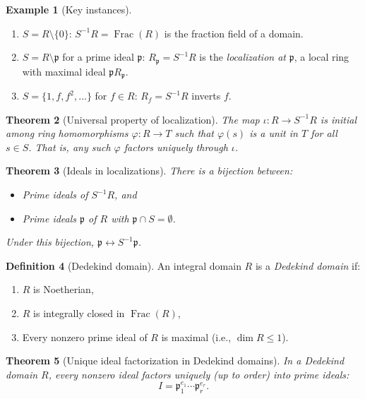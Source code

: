 \documentclass[12pt,a4paper]{amsart}
\newtheorem{theorem}{Theorem}[section]
\theoremstyle{definition}
\newtheorem{definition}[theorem]{Definition}
\newtheorem{example}[theorem]{Example}
\theoremstyle{definition}
\DeclareMathOperator{\Frac}{Frac}
\begin{document}
\begin{example}[Key instances]
\begin{enumerate}[label=(\alph*)]
  \item $S = R \setminus \{0\}$: $S^{-1}R = \Frac(R)$ is the fraction field of a domain.
  \item $S = R \setminus \mathfrak{p}$ for a prime ideal $\mathfrak{p}$:
        $R_\mathfrak{p} = S^{-1}R$ is the \emph{localization at} $\mathfrak{p}$,
        a local ring with maximal ideal $\mathfrak{p}R_\mathfrak{p}$.
  \item $S = \{1, f, f^2, \ldots\}$ for $f \in R$: $R_f = S^{-1}R$ inverts $f$.
\end{enumerate}
\end{example}

\begin{theorem}[Universal property of localization]
The map $\iota\colon R \to S^{-1}R$ is initial among ring homomorphisms $\varphi\colon R \to T$
such that $\varphi(s)$ is a unit in $T$ for all $s \in S$. That is, any such $\varphi$
factors uniquely through $\iota$.
\end{theorem}

\begin{theorem}[Ideals in localizations]
There is a bijection between:
\begin{itemize}
  \item Prime ideals of $S^{-1}R$, and
  \item Prime ideals $\mathfrak{p}$ of $R$ with $\mathfrak{p} \cap S = \emptyset$.
\end{itemize}
Under this bijection, $\mathfrak{p} \leftrightarrow S^{-1}\mathfrak{p}$.
\end{theorem}

\begin{definition}[Dedekind domain]
An integral domain $R$ is a \emph{Dedekind domain} if:
\begin{enumerate}[label=(\roman*)]
  \item $R$ is Noetherian,
  \item $R$ is integrally closed in $\Frac(R)$,
  \item Every nonzero prime ideal of $R$ is maximal (i.e., $\dim R \leq 1$).
\end{enumerate}
\end{definition}

\begin{theorem}[Unique ideal factorization in Dedekind domains]
In a Dedekind domain $R$, every nonzero ideal factors uniquely (up to order) into
prime ideals:
\[
  I = \mathfrak{p}_1^{e_1} \cdots \mathfrak{p}_r^{e_r}.
\]
\end{theorem}
\end{document}

